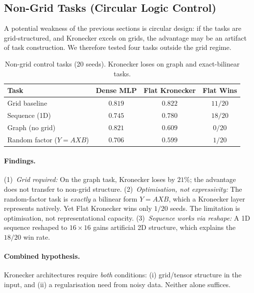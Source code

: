 \documentclass[11pt,a4paper]{article}
\begin{document}
\subsection{Non-Grid Tasks (Circular Logic Control)}
\label{sec:non-grid}

A potential weakness of the previous sections is circular design: if
the tasks are grid-structured, and Kronecker excels on grids, the
advantage may be an artifact of task construction. We therefore tested
four tasks outside the grid regime.

\begin{table}[h]
\centering
\caption{Non-grid control tasks (20 seeds). Kronecker loses on graph
and exact-bilinear tasks.}
\label{tab:non-grid}
\small
\begin{tabular}{lccc}
\toprule
Task & Dense MLP & Flat Kronecker & Flat Wins \\
\midrule
Grid baseline        & $0.819$ & $0.822$ & $11/20$ \\
Sequence (1D)        & $0.745$ & $\mathbf{0.780}$ & $18/20$ \\
Graph (no grid)      & $\mathbf{0.821}$ & $0.609$ & $0/20$ \\
Random factor ($Y = AXB$) & $\mathbf{0.706}$ & $0.599$ & $1/20$ \\
\bottomrule
\end{tabular}
\end{table}

\paragraph{Findings.}
(1)~\emph{Grid required:} On the graph task, Kronecker loses by
$21\%$; the advantage does not transfer to non-grid structure.
(2)~\emph{Optimisation, not expressivity:} The random-factor task is
\emph{exactly} a bilinear form $Y = AXB$, which a Kronecker layer
represents natively. Yet Flat Kronecker wins only $1/20$ seeds.
The limitation is optimisation, not representational capacity.
(3)~\emph{Sequence works via reshape:} A 1D sequence reshaped to
$16 \times 16$ gains artificial 2D structure, which explains the
$18/20$ win rate.

\paragraph{Combined hypothesis.}
Kronecker architectures require \emph{both} conditions:
(i) grid/tensor structure in the input, and (ii) a regularisation
need from noisy data. Neither alone suffices.
\end{document}

